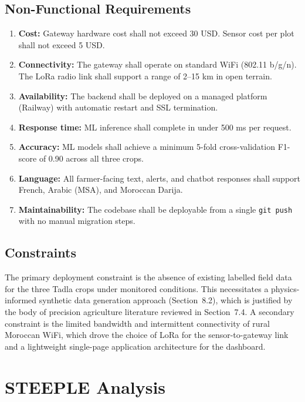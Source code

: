 \documentclass[12pt,a4paper]{report}
\begin{document}
\section{Non-Functional Requirements}

\begin{enumerate}
  \item \textbf{Cost:} Gateway hardware cost shall not exceed 30 USD. Sensor cost per plot shall not exceed 5 USD.
  \item \textbf{Connectivity:} The gateway shall operate on standard WiFi (802.11 b/g/n). The LoRa radio link shall support a range of 2--15 km in open terrain.
  \item \textbf{Availability:} The backend shall be deployed on a managed platform (Railway) with automatic restart and SSL termination.
  \item \textbf{Response time:} ML inference shall complete in under 500 ms per request.
  \item \textbf{Accuracy:} ML models shall achieve a minimum 5-fold cross-validation F1-score of 0.90 across all three crops.
  \item \textbf{Language:} All farmer-facing text, alerts, and chatbot responses shall support French, Arabic (MSA), and Moroccan Darija.
  \item \textbf{Maintainability:} The codebase shall be deployable from a single \texttt{git push} with no manual migration steps.
\end{enumerate}

\section{Constraints}

The primary deployment constraint is the absence of existing labelled field data for the three Tadla crops under monitored conditions. This necessitates a physics-informed synthetic data generation approach (Section~8.2), which is justified by the body of precision agriculture literature reviewed in Section~7.4. A secondary constraint is the limited bandwidth and intermittent connectivity of rural Moroccan WiFi, which drove the choice of LoRa for the sensor-to-gateway link and a lightweight single-page application architecture for the dashboard.

\chapter{STEEPLE Analysis}
\end{document}
